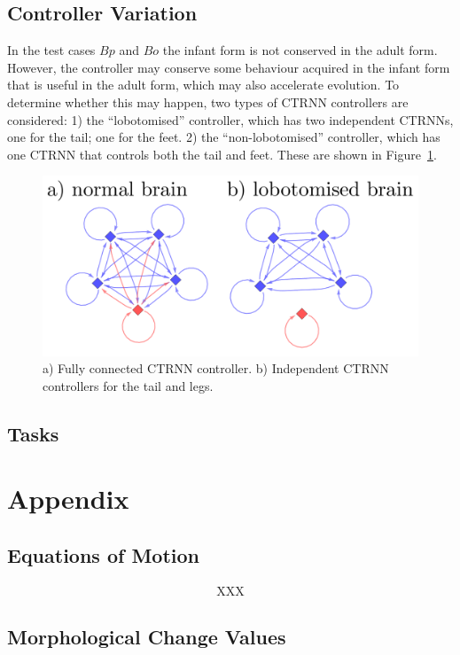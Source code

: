 \subsection{Controller Variation}

In the test cases $Bp$ and $Bo$ the infant form is not conserved in
the adult form.  However, the controller may conserve some behaviour
acquired in the infant form that is useful in the adult form, which
may also accelerate evolution.  To determine whether this may happen,
two types of CTRNN controllers are considered: 1) the ``lobotomised''
controller, which has two independent CTRNNs, one for the tail; one
for the feet. 2) the ``non-lobotomised'' controller, which has one
CTRNN that controls both the tail and feet.  These are shown in
Figure~\ref{ctrnn-figures}.

\begin{figure}[h]
  \label{ctrnn-figures}
  \begin{center} 
    \includegraphics[width=5inch]{fig/ctrnn-figures.pdf}
  \end{center} 
  \caption[Variation of CTRNN controllers]{a) Fully connected CTRNN controller. b) Independent CTRNN
    controllers for the tail and legs.}
\end{figure}

%


\subsection{Tasks}




\section{Appendix}

\subsection{Equations of Motion} \label{physeqs-sec}

\begin{eqnarray}
  \text{XXX} \label{physeqs}
\end{eqnarray}
%

\subsection{Morphological Change Values} \label{morph-regiment-values}
